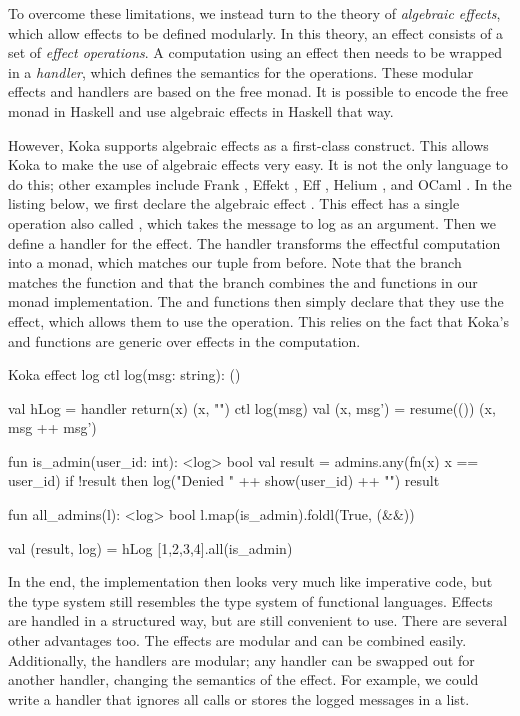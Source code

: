 To overcome these limitations, we instead turn to the theory of \emph{algebraic effects}, which allow effects to be defined modularly. In this theory, an effect consists of a set of \emph{effect operations}. A computation using an effect then needs to be wrapped in a \emph{handler}, which defines the semantics for the operations. These modular effects and handlers are based on the free monad. It is possible to encode the free monad in Haskell and use algebraic effects in Haskell that way.

However, Koka supports algebraic effects as a first-class construct. This allows Koka to make the use of algebraic effects very easy. It is not the only language to do this; other examples include Frank \autocite{lindley_be_2017}, Effekt \autocite{bach_poulsen_hefty_2023}, Eff \autocite{bauer_programming_2015}, Helium \autocite{biernacki_abstracting_2019}, and OCaml \autocite{sivaramakrishnan_retrofitting_2021}. In the listing below, we first declare the algebraic effect . This effect has a single operation also called , which takes the message to log as an argument. Then we define a handler  for the  effect. The handler transforms the effectful computation into a monad, which matches our tuple from before. Note that the  branch matches the  function and that the  branch combines the  and  functions in our monad implementation. The  and  functions then simply declare that they use the  effect, which allows them to use the  operation. This relies on the fact that Koka's  and  functions are generic over effects in the computation.

\begin{lst}{Koka}
effect log
  ctl log(msg: string): ()
  
val hLog = handler
  return(x) (x, "")
  ctl log(msg)
    val (x, msg') = resume(())
    (x, msg ++ msg')
  
fun is_admin(user_id: int): <log> bool
  val result = admins.any(fn(x) x == user_id)
  if !result then
    log("Denied " ++ show(user_id) ++ "\n")
  result
 
fun all_admins(l): <log> bool
  l.map(is_admin).foldl(True, (&&))
  
val (result, log) = hLog { [1,2,3,4].all(is_admin) }
\end{lst}
%
In the end, the implementation then looks very much like imperative code, but the type system still resembles the type system of functional languages. Effects are handled in a structured way, but are still convenient to use. There are several other advantages too. The effects are modular and can be combined easily. Additionally, the handlers are modular; any handler can be swapped out for another handler, changing the semantics of the effect. For example, we could write a handler that ignores all  calls or stores the logged messages in a list.

